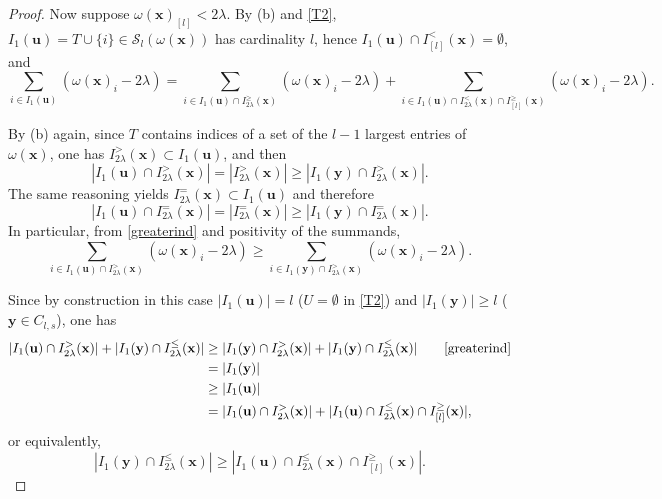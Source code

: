 \documentclass[11pt,a4paper]{article}
\newcommand{\eqjust}[1]{\qquad\eqref{#1}}
\theoremstyle{plain}
\theoremstyle{definition}
\theoremstyle{remark}
\newcommand*\x{\mathbf{x}}
\newcommand*\U{\mathbf{u}}
\newcommand*\y{\mathbf{y}}
\begin{document}
\begin{proof}
  Now suppose \(\omega(\x)_{[l]}<2\lambda\).
  By (b) and \eqref{T2},
  \(I_1(\U)=T\cup\{i\}\in\mathcal{S}_l(\omega(\x))\) has cardinality \(l\),
  hence \(I_1(\U)\cap I_{[l]}^<(\x)=\emptyset\), and
  \begin{equation}
    \label{ubest2}
    \sum_{i \in I_1(\U)}\left(\omega(\x)_i-2 \lambda\right)=\sum_{i \in I_1(\U)\cap I_{2\lambda}^\geq(\x) }\left(\omega(\x)_i-2 \lambda\right)+\sum_{i \in I_1(\U)\cap I_{2\lambda}^<(\x)\cap I_{[l]}^\geq(\x) }\left(\omega(\x)_i-2 \lambda\right).
  \end{equation}

  By (b) again, since \(T\) contains indices of a set of the \(l-1\) largest
  entries of \(\omega(\x)\), one has \(I_{2\lambda}^>(\x)\subset I_1(\U)\), and
  then
  \begin{equation}
    \label{greaterind}
    |I_1(\U) \cap I_{2\lambda}^>(\x)|=|I_{2\lambda}^>(\x)|\geq |I_1(\y) \cap I_{2\lambda}^>(\x)|.
  \end{equation}
  The same reasoning yields \(I^=_{2\lambda}(\x)\subset I_1(\U)\) and therefore
  \begin{equation}
    \label{greaterind2}
    |I_1(\U) \cap I_{2\lambda}^{=}(\x)|=|I_{2\lambda}^{=}(\x)|\geq |I_1(\y) \cap I_{2\lambda}^{=}(\x)|.
  \end{equation}
  In particular, from \eqref{greaterind} and positivity of the summands,
  \begin{equation}
    \label{2lineq}
    \sum_{i \in I_1(\U)\cap I_{2\lambda}^>(\x)}\left(\omega(\x)_i-2 \lambda\right) \geq \sum_{i \in I_1(\y)\cap I_{2\lambda}^>(\x)}\left(\omega(\x)_i-2 \lambda\right).
  \end{equation}

  Since by construction in this case \(|I_1(\U)|= l\) (\(U=\emptyset\) in
  \eqref{T2}) and \(|I_1(\y)|\geq l\) (\(\y\in C_{l,s}\)), one has
  \begin{align*}
    |I_1(\U) \cap I_{2\lambda}^>(\x)|+|I_1(\y) \cap I_{2\lambda}^\leq(\x)|
     & \geq|I_1(\y) \cap I_{2\lambda}^>(\x)|+|I_1(\y) \cap I_{2\lambda}^\leq(\x)| \eqjust{greaterind} \\
     & =|I_1(\y)|
    \\    & \geq |I_1(\U)|
    \\&=|I_1(\U) \cap I_{2\lambda}^>(\x)|+|I_1(\U)\cap I_{2\lambda}^\leq(\x)\cap I_{[l]}^\geq(\x)| ,
  \end{align*}
  or equivalently,
  \begin{equation}
    \label{inddiff}
    |I_1(\y) \cap I_{2\lambda}^\leq(\x)|\geq |I_1(\U)\cap I_{2\lambda}^\leq(\x)\cap I_{[l]}^\geq(\x)|.
  \end{equation}


\end{proof}
\end{document}
